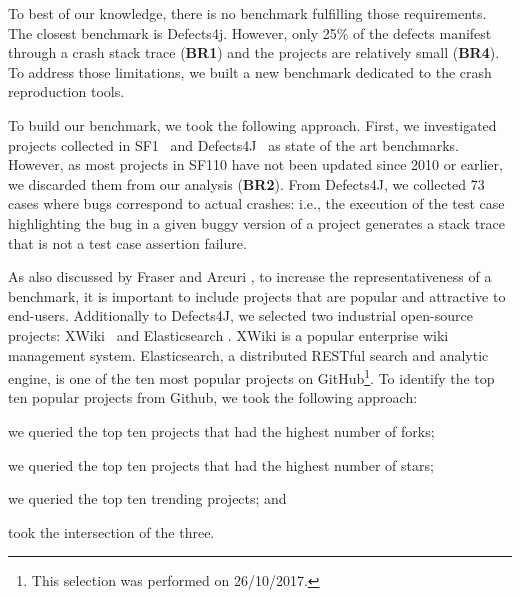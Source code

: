To best of our knowledge, there is no benchmark fulfilling those requirements. The closest benchmark is Defects4j. However, only 25\% of the defects manifest through a crash stack trace (\textbf{BR1}) and the projects are relatively small (\textbf{BR4}). To address those limitations, we built a new benchmark dedicated to the crash reproduction tools.


To build our benchmark, we took the following approach.
First, we investigated projects collected in SF1~\cite{Fraser2014b} and Defects4J~\cite{just2014defects4j} as state of the art benchmarks.
However, as most projects in SF110 have not been updated since 2010 or earlier, we discarded them from our analysis (\textbf{BR2}).
%
From Defects4J, we collected 73 cases where bugs correspond to actual crashes: i.e., the execution of the test case highlighting the bug in a given buggy version of a project generates a stack trace that is not a test case assertion failure. 

As also discussed by Fraser and Arcuri \cite{Fraser2014b}, to increase the representativeness of a benchmark, it is important to include projects that are popular and attractive to end-users.
Additionally to Defects4J, we selected two industrial open-source projects: XWiki~\cite{xwiki} and Elasticsearch \cite{elasticsearch}.
XWiki is a popular enterprise wiki management system.
Elasticsearch, a distributed RESTful search and analytic engine, is one of the ten most popular projects on GitHub\footnote{This selection was performed on 26/10/2017.}.
To identify the top ten popular projects from Github, we took the following approach:
%
\begin{inparaenum}[(i)]
\item we queried the top ten projects that had the highest number of forks;
\item we queried the top ten projects that had the highest number of stars;
\item we queried the top ten trending projects; and
\item took the intersection of the three.
\end{inparaenum}

